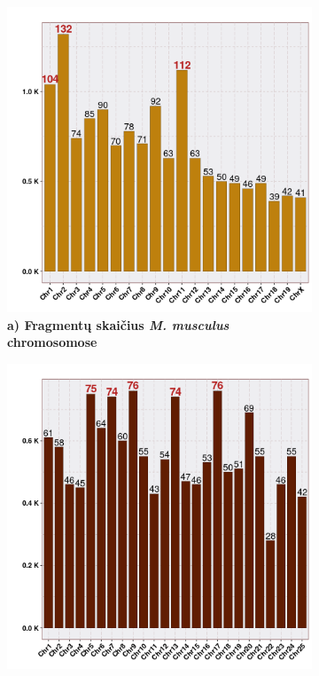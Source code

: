 \documentclass[12pt]{article}
\begin{document}
\begin{figure}[htb]
    \centering
    \begin{subfigure}[b]{0.45\textwidth}
        \centering
        \includegraphics[width=\textwidth]{../Figures/Synteny_Chr_MM.png}
        \caption*{\centering\small\textbf{a) Fragmentų skaičius
                                          \emph{M. musculus} chromosomose}}
    \end{subfigure}
    \hfill
    \begin{subfigure}[b]{0.45\textwidth}
        \centering
        \includegraphics[width=\textwidth]{../Figures/Synteny_Chr_DR.png}

\end{subfigure}
\end{figure}
\end{document}
